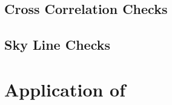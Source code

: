 \subsection{Cross Correlation Checks} \label{subsec:test_corr}


\subsection{Sky Line Checks} \label{subsec:test_sky}


\section[Application of \textsc{stops}]{Application of \stops} \label{sec:results_unpub}





